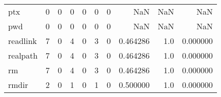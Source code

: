 \begin{longtable}{lrrrrrrrrr}
ptx       &                                                  0 &                                                  0 &                                                  0 &                                                  0 &                                                  0 &                                                  0 &                                                NaN &                                    NaN &                                  NaN \\
pwd       &                                                  0 &                                                  0 &                                                  0 &                                                  0 &                                                  0 &                                                  0 &                                                NaN &                                    NaN &                                  NaN \\
readlink  &                                                  7 &                                                  0 &                                                  4 &                                                  0 &                                                  3 &                                                  0 &                                           0.464286 &                                    1.0 &                             0.000000 \\
realpath  &                                                  7 &                                                  0 &                                                  4 &                                                  0 &                                                  3 &                                                  0 &                                           0.464286 &                                    1.0 &                             0.000000 \\
rm        &                                                  7 &                                                  0 &                                                  4 &                                                  0 &                                                  3 &                                                  0 &                                           0.464286 &                                    1.0 &                             0.000000 \\
rmdir     &                                                  2 &                                                  0 &                                                  1 &                                                  0 &                                                  1 &                                                  0 &                                           0.500000 &                                    1.0 &                             0.000000 \\

\end{longtable}
